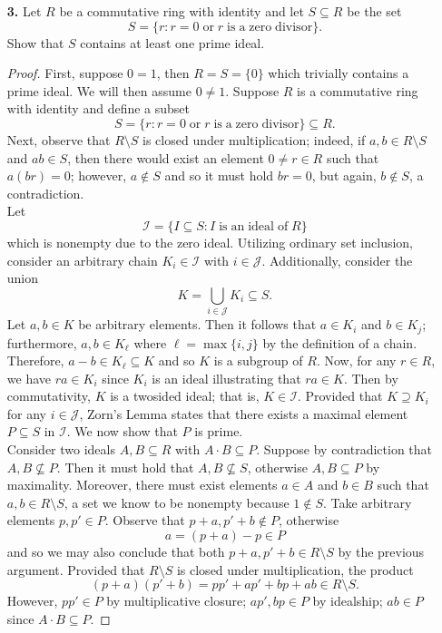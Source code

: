 \documentclass[ 12pt ]{article}
\begin{document}
\begin{enumerate}
	\item[\textbf{3.}] Let $R$ be a commutative ring with identity and let $S \subseteq R$ be the set $$S = \{ r : r = 0\; \mathrm{or}\; r\; \mathrm{is\; a\; zero\; divisor} \}.$$ Show that $S$ contains at least one prime ideal.

		\begin{proof}
			First, suppose $0 = 1$, then $R = S = \{ 0 \}$ which trivially contains a prime ideal. We will then assume $0 \neq 1$. Suppose $R$ is a commutative ring with identity and define a subset $$S = \{ r : r = 0\; \mathrm{or}\; r\; \mathrm{is\; a\; zero\; divisor} \} \subseteq R.$$ Next, observe that $R \setminus S$ is closed under multiplication; indeed, if $a, b \in R \setminus S$ and $ab \in S$, then there would exist an element $0 \neq r \in R$ such that $a(br) = 0$; however, $a \notin S$ and so it must hold $br = 0$, but again, $b \notin S$, a contradiction. \\

			Let $$\mathscr{I} = \{ I \subseteq S : I\; \mathrm{is\; an\; ideal\; of}\; R \}$$ which is nonempty due to the zero ideal. Utilizing ordinary set inclusion, consider an arbitrary chain $K_i \in \mathscr{I}$ with $i \in \mathscr{J}$. Additionally, consider the union $$K = \bigcup_{i \in \mathscr{J}} K_i \subseteq S.$$ Let $a, b \in K$ be arbitrary elements. Then it follows that $a \in K_i$ and $b \in K_j$; furthermore, $a, b \in K_\ell$ where $\ell = \max \{ i, j \}$ by the definition of a chain. Therefore, $a - b \in K_\ell \subseteq K$ and so $K$ is a subgroup of $R$. Now, for any $r \in R$, we have $ra \in K_i$ since $K_i$ is an ideal illustrating that $ra \in K$. Then by commutativity, $K$ is a twosided ideal; that is, $K \in \mathscr{I}$. Provided that $K \supseteq K_i$ for any $i \in \mathscr{J}$, Zorn's Lemma states that there exists a maximal element $P \subseteq S$ in $\mathscr{I}$. We now show that $P$ is prime. \\

			Consider two ideals $A, B \subseteq R$ with $A \cdot B \subseteq P$. Suppose by contradiction that $A, B \nsubseteq P$. Then it must hold that $A, B \nsubseteq S$, otherwise $A, B \subseteq P$ by maximality. Moreover, there must exist elements $a \in A$ and $b \in B$ such that $a, b \in R \setminus S$, a set we know to be nonempty because $1 \notin S$. Take arbitrary elements $p, p' \in P$. Observe that $p + a, p' + b \notin P$, otherwise $$a = (p + a) - p \in P$$ and so we may also conclude that both $p + a, p' + b \in R \setminus S$ by the previous argument. Provided that $R \setminus S$ is closed under multiplication, the product $$(p + a)(p' + b) = pp' + ap' + bp + ab \in R \setminus S.$$ However, $p p' \in P$ by multiplicative closure; $ap', bp \in P$ by idealship; $ab \in P$ since $A \cdot B \subseteq P$.
		\end{proof}


\end{enumerate}
\end{document}
